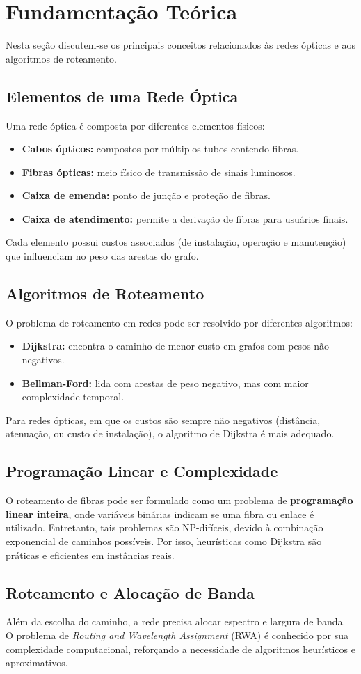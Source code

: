 \section{Fundamentação Teórica} \label{sec:fundaments}

Nesta seção discutem-se os principais conceitos relacionados às redes ópticas e aos algoritmos de roteamento.

\subsection{Elementos de uma Rede Óptica}
Uma rede óptica é composta por diferentes elementos físicos:
\begin{itemize}
    \item \textbf{Cabos ópticos:} compostos por múltiplos tubos contendo fibras.
    \item \textbf{Fibras ópticas:} meio físico de transmissão de sinais luminosos.
    \item \textbf{Caixa de emenda:} ponto de junção e proteção de fibras.
    \item \textbf{Caixa de atendimento:} permite a derivação de fibras para usuários finais.
\end{itemize}
Cada elemento possui custos associados (de instalação, operação e manutenção) que influenciam no peso das arestas do grafo.

\subsection{Algoritmos de Roteamento}
O problema de roteamento em redes pode ser resolvido por diferentes algoritmos:
\begin{itemize}
    \item \textbf{Dijkstra:} encontra o caminho de menor custo em grafos com pesos não negativos.
    \item \textbf{Bellman-Ford:} lida com arestas de peso negativo, mas com maior complexidade temporal.
\end{itemize}
Para redes ópticas, em que os custos são sempre não negativos (distância, atenuação, ou custo de instalação), o algoritmo de Dijkstra é mais adequado.

\subsection{Programação Linear e Complexidade}
O roteamento de fibras pode ser formulado como um problema de \textbf{programação linear inteira},
onde variáveis binárias indicam se uma fibra ou enlace é utilizado.
Entretanto, tais problemas são NP-difíceis, devido à combinação exponencial de caminhos possíveis.
Por isso, heurísticas como Dijkstra são práticas e eficientes em instâncias reais.

\subsection{Roteamento e Alocação de Banda}
Além da escolha do caminho, a rede precisa alocar espectro e largura de banda.
O problema de \textit{Routing and Wavelength Assignment} (RWA) é conhecido por sua complexidade computacional,
reforçando a necessidade de algoritmos heurísticos e aproximativos.
